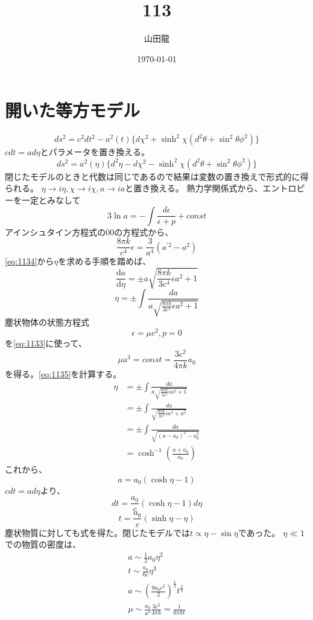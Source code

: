 \documentclass{jsarticle}
\date{\today}
\author{山田龍}
\title{113}
\newcommand{\dder}[2][]{\frac{\mathrm{d}#1}{\mathrm{d}#2}}
\newcommand{\half}{\frac{1}{2}}
\newcommand{\beq}{\begin{equation}}
\newcommand{\eeq}{\end{equation}}
\begin{document}
\maketitle
\section{開いた等方モデル}
\beq
ds^2 = c^2 dt^2 - a^2(t)\{d\chi^2 + \sinh^2\chi(d^2\theta + \sin^2\theta\phi^2)\}
\eeq
$cdt = ad\eta$とパラメータを置き換える。
\beq
    ds^2 = a^2(\eta)\{d^2\eta - d\chi^2 - \sinh^2\chi(d^2\theta + \sin^2\theta\phi^2)\}
\eeq
閉じたモデルのときと代数は同じであるので結果は変数の置き換えで形式的に得られる。
$\eta \rightarrow i \eta, \chi \rightarrow i\chi, a \rightarrow ia$と置き換える。
熱力学関係式から、エントロピーを一定とみなして
\beq\label{eq:1133}
    3\ln a = - \int \frac{d\epsilon}{\epsilon + p} + const
\eeq
アインシュタイン方程式の$00$の方程式から、
\beq\label{eq:1134}
\frac{8\pi k}{c^4} \epsilon = \frac{3}{a^4}(a^{\prime 2} - a^2)
\eeq
\eqref{eq:1134}から$\eta$を求める手順を踏めば、
\beq
    \dder[a]{\eta} = \pm a\sqrt{\frac{8\pi k}{3c^4}\epsilon a^2+1}
\eeq
\beq
    \eta = \pm \int \frac{da}{a\sqrt{\frac{8\pi k}{3c^4}\epsilon a^2 + 1}}
\eeq
塵状物体の状態方程式
\beq\label{eq:1135}
    \epsilon = \mu c^2,p = 0
\eeq
を\eqref{eq:1133}に使って、
\beq
\mu a^3 = const = \frac{3c^2}{4\pi k}a_0
\eeq
を得る。\eqref{eq:1135}を計算する。
\begin{align}
    \eta &= \pm \int \frac{da}{a\sqrt{\frac{8\pi k}{3c^4}\epsilon a^2 + 1}}\\
         &= \pm \int \frac{da}{\sqrt{\frac{8\pi k}{3c^4}\epsilon a^4 + a^2}}\\
         &= \pm \int \frac{da}{\sqrt{(a - a_0)^2 - a_0^2}}\\
         &= \cosh^{-1}(\frac{a+a_0}{a_0})
\end{align}
これから、
\beq
    a = a_0(\cosh \eta - 1)
\eeq
$c dt = a d\eta$より、
\beq
    dt = \frac{a_0}{c}(\cosh\eta - 1)d\eta
\eeq
\beq
    t = \frac{a_0}{c}(\sinh \eta - \eta)
\eeq
塵状物質に対しても式を得た。閉じたモデルでは$t \propto \eta - \sin\eta$であった。
$\eta \ll 1$での物質の密度は、
\begin{align}
    a \sim \half a_0  \eta^2\\
    t \sim \frac{a_0}{6c}\eta^3\\
    a \sim (\frac{9a_0 c^2}{2})^{\frac{1}{3}}t^{\frac{2}{3}}\\
    \mu \sim \frac{a_0}{a^3}\frac{3c^2}{4\pi k} = \frac{1}{6\pi kt}
\end{align}
\end{document}
